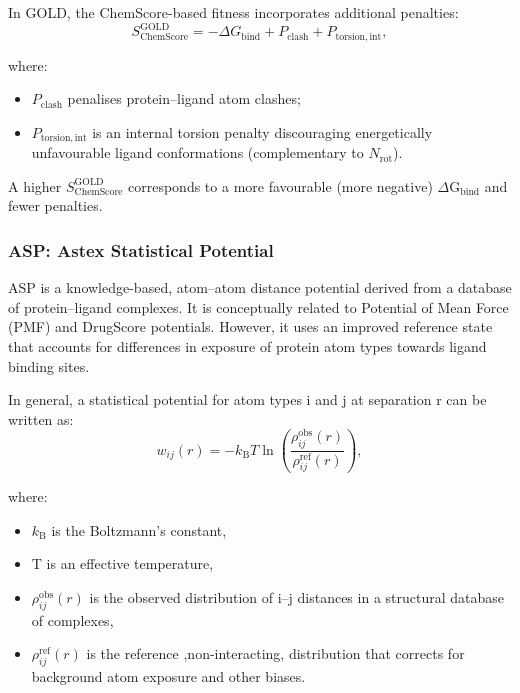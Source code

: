 \documentclass[12pt, a4paper]{article}
\begin{document}
In GOLD, the ChemScore-based fitness\cite{CH7_Wang2003_Suppl} incorporates additional penalties:
\begin{equation}
S_{\mathrm{ChemScore}}^{\mathrm{GOLD}}
=
-\Delta G_{\mathrm{bind}}
+
P_{\mathrm{clash}}
+
P_{\mathrm{torsion,int}},
\end{equation}

where:
\begin{itemize}
    \item $P_{\mathrm{clash}}$ penalises protein–ligand atom clashes;
    \item $P_{\mathrm{torsion,int}}$ is an internal torsion penalty discouraging energetically unfavourable ligand conformations (complementary to $N_{\mathrm{rot}}$).
\end{itemize}
A higher $S_{\mathrm{ChemScore}}^{\mathrm{GOLD}}$ corresponds to a more favourable (more negative) $\Delta \text{G}_{\mathrm{bind}}$ and fewer penalties.

\subsubsection{ASP: Astex Statistical Potential}
ASP is a knowledge-based, atom–atom distance potential derived from a database of protein–ligand complexes.\cite{CH7_Mooij2005} It is conceptually related to Potential of Mean Force (PMF) and DrugScore potentials. However, it uses an improved reference state that accounts for differences in exposure of protein atom types towards ligand binding sites.\cite{CH7_Mooij2005}

In general, a statistical potential for atom types i and j at separation r can be written as:
\begin{equation}
w_{ij}(r)
=
- k_{\mathrm{B}} T
\ln
\left(
\frac{\rho_{ij}^{\mathrm{obs}}(r)}{\rho_{ij}^{\mathrm{ref}}(r)}
\right),
\label{eq:ASP}
\end{equation}

where:
\begin{itemize}
    \item $k_{\mathrm{B}}$ is the Boltzmann's constant,
    \item T is an effective temperature,
    \item $\rho_{ij}^{\mathrm{obs}}(r)$ is the observed distribution of i--j distances in a structural database of complexes,
    \item $\rho_{ij}^{\mathrm{ref}}(r)$ is the reference ,non-interacting, distribution that corrects for background atom exposure and other biases. 
\end{itemize}
\end{document}
